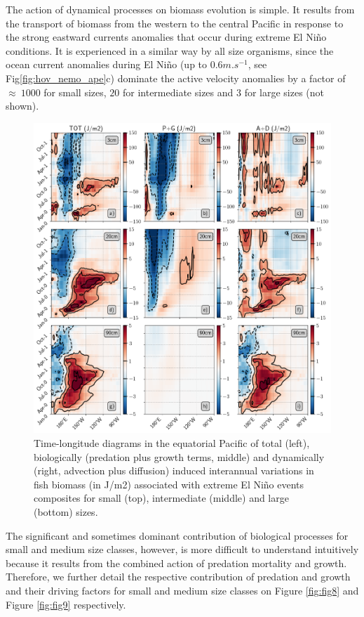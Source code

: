 The action of dynamical processes on biomass evolution is simple. It results from the transport of biomass from the western to the central Pacific in response to the strong eastward currents anomalies that occur during extreme El Niño conditions. It is experienced in a similar way by all size organisms, since the ocean current anomalies during El Niño (up to $0.6 m.s^{-1}$, see Fig\ref{fig:hov_nemo_ape}c) dominate the active velocity anomalies by a factor of $\approx\ 1000$ for small sizes, $20$ for intermediate sizes and $3$ for large sizes (not shown). 

\begin{figure}[h!tp]
	\centering
	\includegraphics[scale=0.4]{figs/fig7.png}	
	\caption{Time-longitude diagrams in the equatorial Pacific of total (left), biologically (predation plus growth terms, middle) and dynamically (right, advection plus diffusion) induced interannual variations in fish biomass (in J/m2) associated with extreme El Niño events composites for small (top), intermediate (middle) and large (bottom) sizes.}
	\label{fig:fig7}
\end{figure}

The significant and sometimes dominant contribution of biological processes for small and medium size classes, however, is more difficult to understand intuitively because it results from the combined action of predation mortality and growth. Therefore, we further detail the respective contribution of predation and growth and their driving factors for small and medium size classes on Figure \ref{fig:fig8} and Figure \ref{fig:fig9} respectively.


